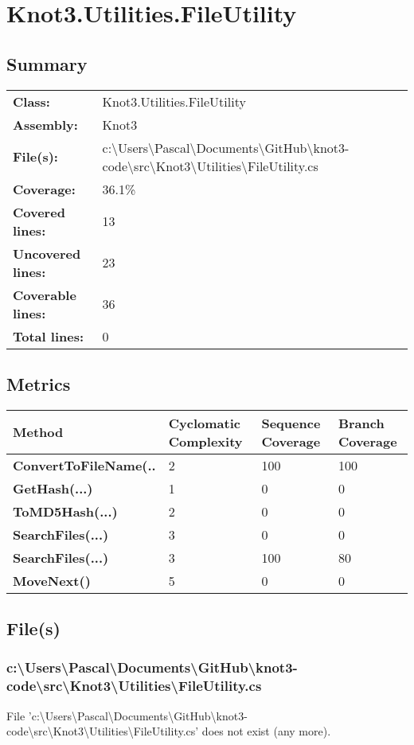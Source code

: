 \documentclass[a4paper,10pt]{article}
\begin{document}
\section{Knot3.Utilities.FileUtility}
\subsection{Summary}
\begin{longtable}[l]{ll}
\textbf{Class:} & Knot3.Utilities.FileUtility\\
\textbf{Assembly:} & Knot3\\
\textbf{File(s):} & \begin{minipage}[t]{12cm}{c:\textbackslash Users\textbackslash Pascal\textbackslash Documents\textbackslash GitHub\textbackslash knot3-code\textbackslash src\textbackslash Knot3\textbackslash Utilities\textbackslash FileUtility.cs}\end{minipage} \\
\textbf{Coverage:} & 36.1\%\\
\textbf{Covered lines:} & 13\\
\textbf{Uncovered lines:} & 23\\
\textbf{Coverable lines:} & 36\\
\textbf{Total lines:} & 0\\
\end{longtable}
\subsection{Metrics}
\begin{longtable}[l]{|l|l|l|l|}
\hline
\textbf{Method} & \textbf{Cyclomatic Complexity} & \textbf{Sequence Coverage} & \textbf{Branch Coverage}\\
\hline
\textbf{ConvertToFileName(..} & 2 & 100 & 100\\
\hline
\textbf{GetHash(...)} & 1 & 0 & 0\\
\hline
\textbf{ToMD5Hash(...)} & 2 & 0 & 0\\
\hline
\textbf{SearchFiles(...)} & 3 & 0 & 0\\
\hline
\textbf{SearchFiles(...)} & 3 & 100 & 80\\
\hline
\textbf{MoveNext()} & 5 & 0 & 0\\
\hline
\end{longtable}
\subsection{File(s)}
\subsubsection{c:\textbackslash Users\textbackslash Pascal\textbackslash Documents\textbackslash GitHub\textbackslash knot3-code\textbackslash src\textbackslash Knot3\textbackslash Utilities\textbackslash FileUtility.cs}
 File 'c:\textbackslash Users\textbackslash Pascal\textbackslash Documents\textbackslash GitHub\textbackslash knot3-code\textbackslash src\textbackslash Knot3\textbackslash Utilities\textbackslash FileUtility.cs' does not exist (any more).
\newpage
\end{document}
